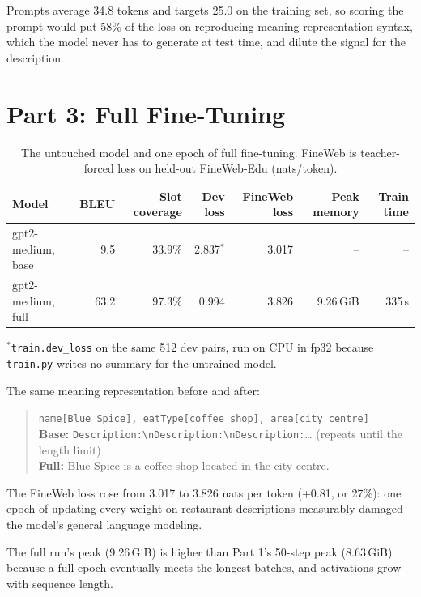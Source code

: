 \documentclass[10pt]{article}
\begin{document}
Prompts average 34.8 tokens and targets 25.0 on the training set, so
scoring the prompt would put 58\% of the loss on reproducing
meaning-representation syntax, which the model never has to generate at
test time, and dilute the signal for the description.

\section*{Part 3: Full Fine-Tuning}

\begin{table}[htbp]
\caption{The untouched model and one epoch of full fine-tuning.
FineWeb is teacher-forced loss on held-out FineWeb-Edu (nats/token).}
\label{tab:fft}
\centering
\begin{tabular}{lrrrrrr}
\toprule
Model & BLEU & Slot coverage & Dev loss & FineWeb loss & Peak memory & Train time \\
\midrule
gpt2-medium, base & 9.5  & 33.9\% & 2.837$^{*}$ & 3.017 & --        & --    \\
gpt2-medium, full & 63.2 & 97.3\% & 0.994       & 3.826 & 9.26\,GiB & 335\,s \\
\bottomrule
\end{tabular}

\smallskip
\footnotesize $^{*}$\texttt{train.dev\_loss} on the same 512 dev pairs,
run on CPU in fp32 because \texttt{train.py} writes no summary for the
untrained model.
\end{table}

The same meaning representation before and after:

\begin{quote}\small
\texttt{name[Blue Spice], eatType[coffee shop], area[city centre]}\\[2pt]
\textbf{Base:} \verb|Description:\nDescription:\nDescription:|\ldots
(repeats until the length limit)\\
\textbf{Full:} Blue Spice is a coffee shop located in the city centre.
\end{quote}

The FineWeb loss rose from 3.017 to 3.826 nats per token (+0.81, or
27\%): one epoch of updating every weight on restaurant descriptions
measurably damaged the model's general language modeling.

The full run's peak (9.26\,GiB) is higher than Part 1's 50-step peak
(8.63\,GiB) because a full epoch eventually meets the longest batches,
and activations grow with sequence length.
\end{document}

